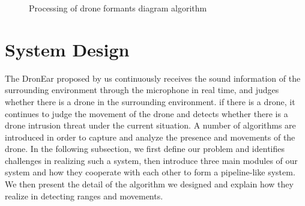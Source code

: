 \documentclass{sig-alternate-10pt}
\begin{document}
\begin{figure}[!h]
	\centering
	\caption{Processing of drone formants diagram algorithm}
	\label{formants}
\end{figure}

\section{System Design}

The DronEar proposed by us continuously receives the sound information of the surrounding environment through the microphone in real time, and judges whether there is a drone in the surrounding environment. if there is a drone, it continues to judge the movement of the drone and detects whether there is a drone intrusion threat under the current situation.
A number of algorithms are introduced in order to capture and analyze the presence and movements of the drone.
In the following subsection, we first define our problem and identifies challenges in realizing such a system, then introduce three main modules of our system and how they cooperate with each other to form a pipeline-like system. We then present the detail of the algorithm we designed and explain how they realize in detecting ranges and movements.
\end{document}
